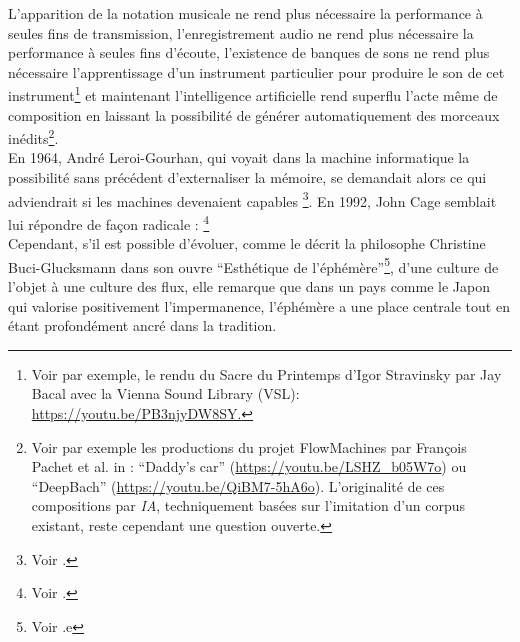 \noindent L’apparition de la notation musicale ne rend plus nécessaire la performance à seules fins de transmission, l’enregistrement audio ne rend plus nécessaire la performance à seules fins d’écoute, l’existence de banques de sons ne rend plus nécessaire l’apprentissage d’un instrument particulier pour produire le son de cet instrument\footnote{\label{fn:bacal}Voir par exemple, le rendu du Sacre du Printemps d'Igor Stravinsky par Jay Bacal avec la Vienna Sound Library (VSL): \url{https://youtu.be/PB3njyDW8SY.}} et maintenant l’intelligence artificielle rend superflu l'acte même de composition en laissant la possibilité de générer automatiquement des morceaux inédits\footnote{Voir par exemple les productions du projet FlowMachines par François Pachet et al. in \cite{hadjeres_deepbach:_2016}: “Daddy's car” (\url{https://youtu.be/LSHZ_b05W7o}) ou “DeepBach” (\url{https://youtu.be/QiBM7-5hA6o}). L'originalité de ces compositions par \textit{IA}, techniquement basées sur l'imitation d'un corpus existant, reste cependant une question ouverte.}.\\
\indent En 1964, André Leroi-Gourhan, qui voyait dans la machine informatique la possibilité sans précédent d'externaliser la mémoire, se demandait alors ce qui adviendrait si les machines devenaient capables  \footnote{Voir \cite{leroi-gourhan_geste_1964}.}. En 1992, John Cage semblait lui répondre de façon radicale : \footnote{Voir \cite{sebestik_ecoute_1992}.}\\
\indent Cependant, s'il est possible d'évoluer, comme le décrit la philosophe Christine Buci-Glucksmann dans son ouvre ``Esthétique de l’éphémère''\footnote{Voir \cite{buci-glucksmann_esthetique_2003}.e}, d'une culture de l'objet à une culture des flux, elle remarque que dans un pays comme le Japon qui valorise positivement l'impermanence, l'éphémère a une place centrale tout en étant profondément ancré dans la tradition.\\
